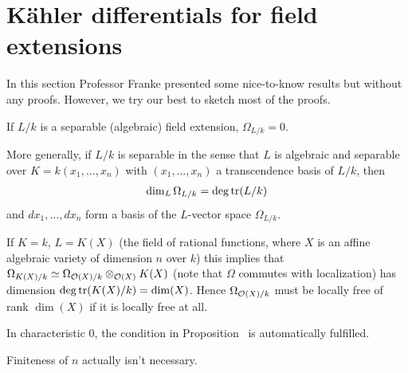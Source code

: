 \documentclass[a4paper,parskip=half,numbers=enddot, DIV=12]{scrreprt}
\begin{document}
\section{Kähler differentials for field extensions}
In this section Professor Franke presented some nice-to-know results but without any proofs. However, we try our best to sketch most of the proofs.

\begin{prop}
	\begin{alphanumerate}
		\item {}If $L/k$ is a separable (algebraic) field extension, $\Omega_{L/k} = 0$.
		\item More generally, if $L/k$ is separable in the sense that $L$ is algebraic and separable over $K=k(x_1,\ldots,x_n)$ with $(x_1,\ldots,x_n)$ a transcendence basis of $L/k$, then
		\begin{align*}
			\dim_L\Omega_{L/k}=\deg\operatorname{tr}(L/k)
		\end{align*}
		and $dx_1,\ldots,dx_n$ form a basis of the $L$-vector space $\Omega_{L/k}$.
	\end{alphanumerate}
\end{prop}
\begin{rem*}
	\begin{alphanumerate}
		\item If $K = k$, $L = K(X)$ (the field of rational functions, where $X$ is an affine algebraic variety of dimension $n$ over $k$) this implies that $\Omega_{K(X)/k} \simeq \Omega_{\mathcal{O}(X)/k} \otimes_{\mathcal{O}(X)} K(X) $ (note that $\Omega$ commutes with localization) has dimension $\deg\operatorname{tr}(K(X)/k) = \dim (X)$. Hence $\Omega_{\mathcal{O}(X)/k}$ must be locally free of rank $\dim(X)$ if it is locally free at all.
		\item In characteristic 0, the condition in Proposition~ is automatically fulfilled.
		\item Finiteness of $n$ actually isn't necessary.
	\end{alphanumerate}    
\end{rem*}
\end{document}
